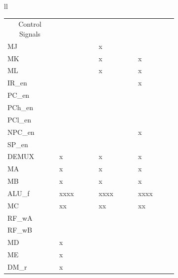 \documentclass[11pt]{article}
\begin{document}
\begin{enumerate}[leftmargin=0.2in]
\begin{enumerate}
      \begin{table}[H]
        \centering
        \begin{tabular}{ll}
          \begin{tabular}{|p{0.1\linewidth}|>{\centering\arraybackslash}p{0.1\linewidth}|>{\centering\arraybackslash}p{0.1\linewidth}|>{\centering\arraybackslash}p{0.1\linewidth}|}\hline
            \multicolumn{1}{|c|}{\multirow{2}{0.1\linewidth}{Control Signals}} & \multicolumn{1}{c|}{\multirow{2}{*}{IF}} & \multicolumn{2}{c|}{\texttt{ICALL}} \\ \cline{3-4} 
            \multicolumn{1}{|c|}{} & \multicolumn{1}{c|}{} & \multicolumn{1}{c|}{EX1} & \multicolumn{1}{c|}{EX2} \\ \hhline{|=|=|=|=|}
            MJ        & 0     & x     & 1     \\ \hline
            MK        & 0     & x     & x     \\ \hline
            ML        & 0     & x     & x     \\ \hline
            IR\_en    & 1     & 0     & x     \\ \hline
            PC\_en    & 1     & 0     & 1     \\ \hline
            PCh\_en   & 0     & 0     & 0     \\ \hline
            PCl\_en   & 0     & 0     & 0     \\ \hline
            NPC\_en   & 1     & 0     & x     \\ \hline
            SP\_en    & 0     & 1     & 1     \\ \hline
            DEMUX     & x     & x     & x     \\ \hhline{|=|=|=|=|}
            MA        & x     & x     & x     \\ \hline
            MB        & x     & x     & x     \\ \hline
            ALU\_f    & xxxx  & xxxx  & xxxx  \\ \hline
            MC        & xx    & xx    & xx    \\ \hline
            RF\_wA    & 0     & 0     & 0     \\ \hline
            RF\_wB    & 0     & 0     & 0     \\ \hline
            MD        & x     & 0     & 0     \\ \hline
            ME        & x     & 0     & 0     \\ \hline
            DM\_r     & x     & 0     & 0     \\ \hline

\end{tabular}
\end{tabular}
\end{table}
\end{enumerate}
\end{enumerate}
\end{document}
